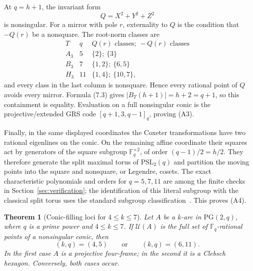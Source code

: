 \documentclass[11pt]{article}
\newtheorem{theorem}{Theorem}[section]
\theoremstyle{definition}
\theoremstyle{remark}
\newcommand{\PG}{\mathrm{PG}}
\newcommand{\F}{\mathbb{F}}
\newcommand{\cU}{\mathcal{U}}
\begin{document}
At $q=h+1$, the invariant form
\[
 Q=X^2+Y^2+Z^2
\]
is nonsingular.  For a mirror with pole $r$, externality to $Q$ is the
condition that $-Q(r)$ be a nonsquare.  The root-norm classes are
\[
\begin{array}{c|c|c}
T&q&Q(r)\text{ classes};\ -Q(r)\text{ classes}\\ \hline
A_3&5&\{2\};\ \{3\}\\
B_3&7&\{1,2\};\ \{6,5\}\\
H_3&11&\{1,4\};\ \{10,7\},
\end{array}
\]
and every class in the last column is nonsquare.  Hence every rational
point of $Q$ avoids every mirror.  Formula (7.3) gives
$|B_T(h+1)|=h+2=q+1$, so this containment is equality.  Evaluation on a
full nonsingular conic is the projective/extended GRS code
$[q+1,3,q-1]_q$, proving (A3).

Finally, in the same displayed coordinates the Coxeter transformations
have two rational eigenlines on the conic.  On the remaining affine
coordinate their squares act by generators of the square subgroup
$\F_q^{\times2}$, of order $(q-1)/2=h/2$.  They therefore generate the
split maximal torus of $\mathrm{PSL}_2(q)$ and partition the moving points
into the square and nonsquare, or Legendre, cosets.  The exact
characteristic polynomials and orders for $q=5,7,11$ are among the finite
checks in Section~\ref{sec:verification}; the identification of this
literal subgroup with the classical split torus uses the standard
subgroup classification~\cite{Giudici2007}.  This proves (A4).

\begin{theorem}[Conic-filling loci for $4\le k\le7$]
\label{thm:small-k-conic-filling}
Let $A$ be a $k$-arc in $\PG(2,q)$, where $q$ is a prime power and
$4\le k\le7$. If $\cU(A)$ is the full set of $\F_q$-rational points of a
nonsingular conic, then
\[
 (k,q)=(4,5)\qquad\text{or}\qquad(k,q)=(6,11).
\]
In the first case $A$ is a projective four-frame; in the second it is a
Clebsch hexagon. Conversely, both cases occur.
\end{theorem}
\end{document}
